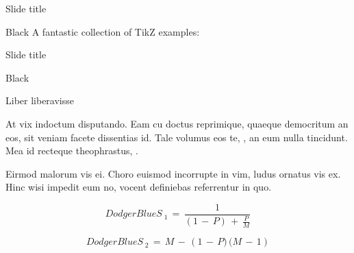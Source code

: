 \documentclass{MichiganTech}
\begin{document}
%
\begin{frame}{Slide title}
  \vspace*{0.10in}
  \begin{reference}{4mm}{84mm}{Black}
    A fantastic collection of TikZ examples: 
    \href{http://texample.net}{}
  \end{reference}

  \begin{center}
  \end{center}
\end{frame}

%
\begin{frame}{Slide title}
  \vspace*{0.10in}
  \begin{reference}{4mm}{84mm}{Black}
    \;
  \end{reference}

  \begin{beamerboxesrounded}[upper=brainstormboxhead,lower=brainstormboxbody,shadow=true]{Liber liberavisse}
    \begin{flushleft}
      At vix indoctum disputando. Eam cu doctus reprimique, quaeque democritum
      an eos, sit veniam facete dissentias id. Tale volumus eos te, ,
      an eum nulla tincidunt. Mea id recteque theophrastus, .

      \vspace*{0.10in}
      Eirmod malorum vis ei. Choro euismod incorrupte in vim, ludus ornatus 
      vis ex. Hinc wisi impedit eum no, vocent definiebas referrentur in quo. 

      \vspace*{0.10in}
      \begin{equation*}
        \boxed{DodgerBlue}{S_{\mathrm{\;1}} \,=\, \frac{1}{\left(1 \,-\, P\right)\, +\, \frac{P}{M}}}
      \end{equation*}

      \vspace*{0.10in}
      \begin{equation*}
        \boxed{DodgerBlue}{S_{\mathrm{\;2}} \,=\, M \,-\, \left( 1 \,-\, P)\,(M \,-\, 1\right)}
      \end{equation*}

      \vspace*{0.10in}
    \end{flushleft}
  \end{beamerboxesrounded}
\end{frame}
\end{document}
